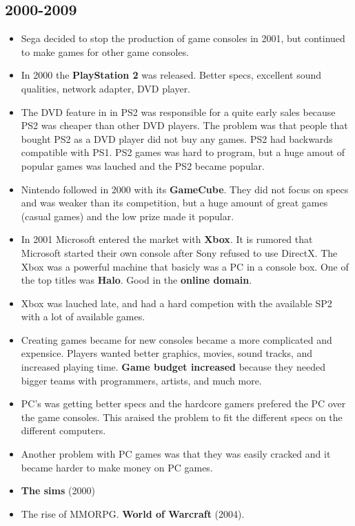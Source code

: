  \subsection*{2000-2009}
    \begin{itemize}
      \item Sega decided to stop the production of game consoles in 2001, but continued to make games for other game consoles. 
      \item In 2000 the {\bf PlayStation 2} was released. Better specs, excellent sound qualities, network adapter, DVD player.
      \item The DVD feature in in PS2 was responsible for a quite early sales because PS2 was cheaper than other DVD players. The problem was that people that bought PS2 as a DVD player did not buy any games. PS2 had backwards compatible with PS1. PS2 games was hard to program, but a huge amout of popular games was lauched and the PS2 became popular. 
      \item Nintendo followed in 2000 with its {\bf GameCube}. They did not focus on specs and was weaker than its competition, but a huge amount of great games (casual games) and the low prize made it popular. 
      \item In 2001 Microsoft entered the market with {\bf Xbox}. It is rumored that Microsoft started their own console after Sony refused to use DirectX. The Xbox was a powerful machine that basicly was a PC in a console box. One of the top titles was {\bf Halo}. Good in the {\bf online domain}.
      \item Xbox was lauched late, and had a hard competion with the available SP2 with a lot of available games. 
      \item Creating games became for new consoles became a more complicated and expensice. Players wanted better graphics, movies, sound tracks, and increased playing time. {\bf Game budget increased} because they needed bigger teams with programmers, artists, and much more. 
      \item PC's was getting better specs and the hardcore gamers prefered the PC over the game consoles. This araised the problem to fit the different specs on the different computers. 
      \item Another problem with PC games was that they was easily cracked and it became harder to make money on PC games. 
      \item {\bf The sims} (2000)
      \item The rise of MMORPG. {\bf World of Warcraft} (2004).

\end{itemize}
